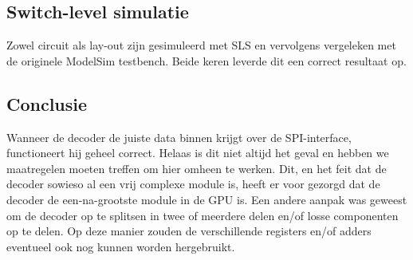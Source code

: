\documentclass{scrartcl} %
\begin{document}
\subsection{Switch-level simulatie}
Zowel circuit als lay-out zijn gesimuleerd met SLS en vervolgens vergeleken met de originele ModelSim testbench. Beide keren leverde dit een correct resultaat op.

\subsection{Conclusie}
Wanneer de decoder de juiste data binnen krijgt over de SPI-interface, functioneert hij geheel correct. Helaas is dit niet altijd het geval en hebben we maatregelen moeten treffen om hier omheen te werken. Dit, en het feit dat de decoder sowieso al een vrij complexe module is, heeft er voor gezorgd dat de decoder de een-na-grootste module in de GPU is. Een andere aanpak was geweest om de decoder op te splitsen in twee of meerdere delen en/of losse componenten op te delen. Op deze manier zouden de verschillende registers en/of adders eventueel ook nog kunnen worden hergebruikt.
\end{document}
